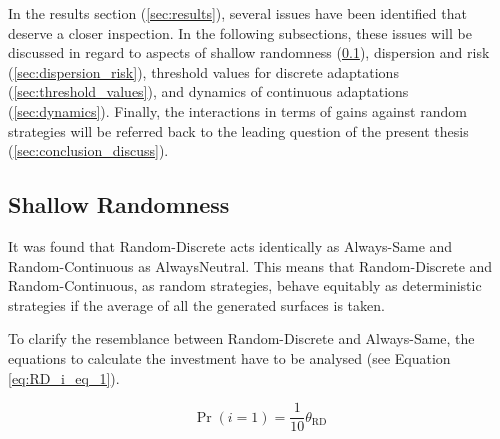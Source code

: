 \documentclass[11pt]{article}
\begin{document}
In the results section (\ref{sec:results}), several issues have been identified that deserve a closer inspection.
In the following subsections, these issues will be discussed in regard to aspects of shallow randomness (\ref{sec:shallow_randomness}), dispersion and risk (\ref{sec:dispersion_risk}), threshold values for discrete adaptations (\ref{sec:threshold_values}), and dynamics of continuous adaptations (\ref{sec:dynamics}).
Finally, the interactions in terms of gains against random strategies will be referred back to the leading question of the present thesis (\ref{sec:conclusion_discuss}).

\subsection{Shallow Randomness} \label{sec:shallow_randomness}

	It was found that Random-Discrete acts identically as Always-Same and Random-Continuous as AlwaysNeutral.
	This means that Random-Discrete and Random-Continuous, as random strategies, behave equitably as deterministic strategies if the average of all the generated surfaces is taken.
		
	To clarify the resemblance between Random-Discrete and Always-Same, the equations to calculate the investment have to be analysed (see Equation \ref{eq:RD_i_eq_1}).


	\begin{equation}
		\Pr(i = 1) = \frac{1}{10} \theta_{\mathrm{RD}}
		\label{eq:RD_i_eq_discuss}
	\end{equation}

\end{document}

